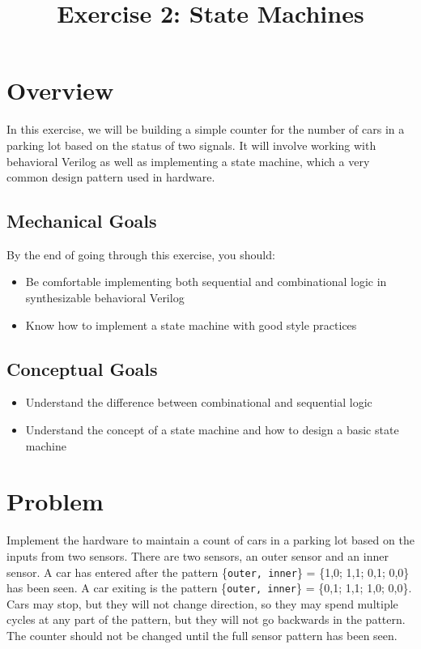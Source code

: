 \documentclass{article}
\begin{document}
\title{Exercise 2: State Machines}
\date{}
\maketitle

\section*{Overview}
In this exercise, we will be building a simple counter for the number of cars in
a parking lot based on the status of two signals. It will involve working with
behavioral Verilog as well as implementing a state machine, which a very common
design pattern used in hardware.

\subsection*{Mechanical Goals}
By the end of going through this exercise, you should:
\begin{itemize}
    \item Be comfortable implementing both sequential and combinational logic in
    synthesizable behavioral Verilog
    \item Know how to implement a state machine with good style practices
\end{itemize}

\subsection*{Conceptual Goals}
\begin{itemize}
    \item Understand the difference between combinational and sequential logic
    \item Understand the concept of a state machine and how to design a basic
    state machine 
\end{itemize}

\section*{Problem}
Implement the hardware to maintain a count of cars in a parking lot based on the
inputs from two sensors. There are two sensors, an outer sensor and an inner
sensor. A car has entered after the pattern \{\texttt{outer, inner}\} = \{1,0; 1,1;
0,1; 0,0\} has been seen. A car exiting is the pattern \{\texttt{outer, inner}\} =
\{0,1; 1,1; 1,0; 0,0\}. Cars may stop, but they will not change direction, so they
may spend multiple cycles at any part of the pattern, but they will not go
backwards in the pattern.  The counter should not be changed until the full sensor
pattern has been seen.
\end{document}
